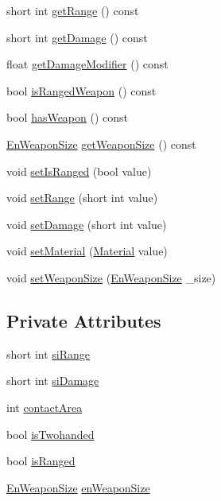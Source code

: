 \begin{DoxyCompactItemize}
\item 
short int \mbox{\hyperlink{class_weapon_a726f5f0de9244b9e24e52407272cdf08}{get\+Range}} () const
\item 
short int \mbox{\hyperlink{class_weapon_adb39958d1bfe60371314991040ab04fd}{get\+Damage}} () const
\item 
float \mbox{\hyperlink{class_weapon_aa721632fc6af9548259814f4a4795757}{get\+Damage\+Modifier}} () const
\item 
bool \mbox{\hyperlink{class_weapon_a05aac2a3ad6a6b173025eb66c20de924}{is\+Ranged\+Weapon}} () const
\item 
bool \mbox{\hyperlink{class_weapon_a99c74249e561d0130575a2278a982a6c}{has\+Weapon}} () const
\item 
\mbox{\hyperlink{_weapon_8hpp_a160076f6c574c69cd1ce2b3f42cf3755}{En\+Weapon\+Size}} \mbox{\hyperlink{class_weapon_a459fd4ef8f2eefc9be73f05b6ec42bcd}{get\+Weapon\+Size}} () const
\item 
void \mbox{\hyperlink{class_weapon_a73bb6176d7e535811f30a3ee9df53b8d}{set\+Is\+Ranged}} (bool value)
\item 
void \mbox{\hyperlink{class_weapon_aa6f690fe5e69ce11628b245739c74dc5}{set\+Range}} (short int value)
\item 
void \mbox{\hyperlink{class_weapon_a0c582ba1c1413a4ecda931bb8acff458}{set\+Damage}} (short int value)
\item 
void \mbox{\hyperlink{class_weapon_a2861d732a0cccff20a9ea29548d05702}{set\+Material}} (\mbox{\hyperlink{class_material}{Material}} value)
\item 
void \mbox{\hyperlink{class_weapon_a78e4b6c131a25e93f647594191bae38d}{set\+Weapon\+Size}} (\mbox{\hyperlink{_weapon_8hpp_a160076f6c574c69cd1ce2b3f42cf3755}{En\+Weapon\+Size}} \+\_\+size)
\end{DoxyCompactItemize}
\subsection*{Private Attributes}
\begin{DoxyCompactItemize}
\item 
short int \mbox{\hyperlink{class_weapon_afb5789f93e22dfb039d273f0bd4480b0}{si\+Range}}
\item 
short int \mbox{\hyperlink{class_weapon_aedd020151d162c99d7fc5e28f627c517}{si\+Damage}}
\item 
int \mbox{\hyperlink{class_weapon_a7bdfc4c90d872b07d6dc78d9d0f4e662}{contact\+Area}}
\item 
bool \mbox{\hyperlink{class_weapon_a790c117505d8bf62c8297b3f87396070}{is\+Twohanded}}
\item 
bool \mbox{\hyperlink{class_weapon_a7e50af15bd27dfffe931e051b02101ac}{is\+Ranged}}
\item 
\mbox{\hyperlink{_weapon_8hpp_a160076f6c574c69cd1ce2b3f42cf3755}{En\+Weapon\+Size}} \mbox{\hyperlink{class_weapon_a24ad6d1a7d69604fc35d5c7f65245df4}{en\+Weapon\+Size}}
\end{DoxyCompactItemize}
